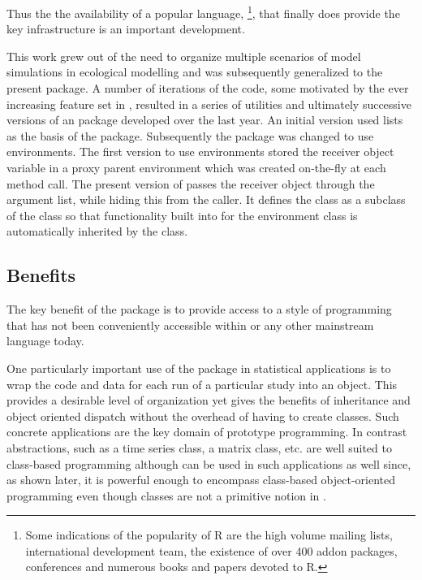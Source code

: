 \documentclass{Z}
\begin{document}
Thus the
the availability of a popular language,
 \footnote{Some indications of the popularity of R are
the high volume mailing lists, international development team, the
existence of over 400 addon packages, conferences and numerous books 
and papers devoted to R.},
that finally does provide the key infrastructure 
is an important development.



This work grew out of the need to organize multiple scenarios of model
simulations in ecological modelling \citep{Rnews:Petzoldt:2003} and
was subsequently generalized to the present package.  A number of
iterations of the code, some motivated by the ever increasing feature
set in , resulted in a series of utilities and ultimately
successive versions of an  package developed over the last
year.  An initial version used  lists as the basis of the
package.  Subsequently the package was changed to use 
environments.  The first version to use environments stored the
receiver object variable in a proxy parent environment which was
created on-the-fly at each method call.  The present version of
 passes the receiver object through the argument list,
while hiding this from the caller.  It defines the  class
as a subclass of the   class so that
functionality built into  for the environment class is
automatically inherited by the  class.

\subsection{Benefits}

The key benefit of the  package is to provide 
access to a style of programming that has not been conveniently
accessible within  or any other mainstream language today.

One particularly important use of the  package
in statistical applications is
to wrap the code and data for each run of a particular
study into an object. This provides
a desirable level of organization yet gives the benefits of
inheritance and object oriented dispatch without the overhead
of having to create classes.  Such concrete applications are the
key domain of prototype programming. In contrast abstractions,
such as a time series class, a matrix class, etc.
are well suited to 
class-based programming although 
can be used in such applications as well since, as shown later,
it is powerful
enough to encompass class-based object-oriented programming
even though classes are not a primitive notion in .
\end{document}
